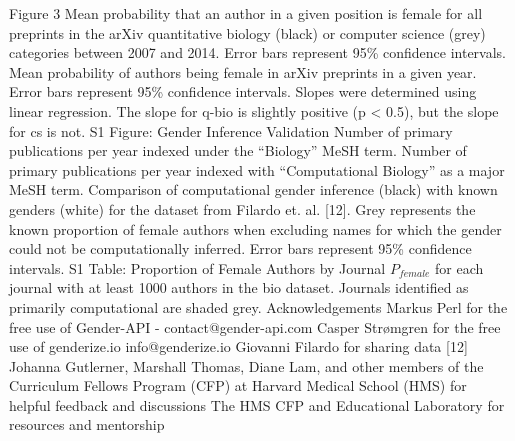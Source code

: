 \documentclass[11pt]{article}
\begin{document}
Figure 3
Mean probability that an author in a given position is female for all preprints in the arXiv quantitative biology (black) or computer science (grey) categories between 2007 and 2014. Error bars represent 95\% confidence intervals.
Mean probability of authors being female in arXiv preprints in a given year. Error bars represent 95\% confidence intervals. Slopes were determined using linear regression. The slope for q-bio is slightly positive (p < 0.5), but the slope for cs is not.
S1 Figure: Gender Inference Validation
Number of primary publications per year indexed under the “Biology” MeSH term.
Number of primary publications per year indexed with “Computational Biology” as a major MeSH term.
Comparison of computational gender inference (black) with known genders (white) for the dataset from Filardo et. al. [12]. Grey represents the known proportion of female authors when excluding names for which the gender could not be computationally inferred. Error bars represent 95\% confidence intervals.
S1 Table: Proportion of Female Authors by Journal
$P_{female}$ for each journal with at least 1000 authors in the bio dataset. Journals identified as primarily computational are shaded grey.
Acknowledgements
Markus Perl for the free use of Gender-API - contact@gender-api.com
Casper Strømgren for the free use of genderize.io info@genderize.io
Giovanni Filardo for sharing data [12]
Johanna Gutlerner, Marshall Thomas, Diane Lam, and other members of the Curriculum Fellows Program (CFP) at Harvard Medical School (HMS) for helpful feedback and discussions
The HMS CFP and Educational Laboratory for resources and mentorship
\end{document}
